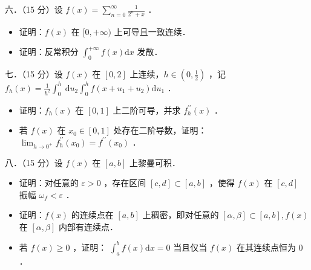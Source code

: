 \documentclass{article}
\begin{document}
六．（15 分）设 \(f(x)=\sum_{n=0}^{\infty} \frac{1}{2^{n}+x}\) ．

\begin{itemize}
  \item[（1）] 证明：\(f(x)\) 在 \([0,+\infty)\) 上可导且一致连续．
  \item[（2）] 证明：反常积分 \(\int_{0}^{+\infty} f(x) \mathrm{d} x\) 发散．
\end{itemize}

七．（15 分）设 \(f(x)\) 在 \([0,2]\) 上连续，\(h \in\left(0, \frac{1}{2}\right)\) ，记 \(f_{h}(x)=\frac{1}{h^{2}} \int_{0}^{h} \mathrm{~d} u_{2} \int_{0}^{h} f\left(x+u_{1}+u_{2}\right) \mathrm{d} u_{1}\) ．

\begin{itemize}
  \item[（1）] 证明：\(f_{h}(x)\) 在 \([0,1]\) 上二阶可导，并求 \(f_{h}^{\prime \prime}(x)\) ．
  \item[（2）] 若 \(f(x)\) 在 \(x_{0} \in[0,1]\) 处存在二阶导数，证明： \(\lim _{h \rightarrow 0^{+}} f_{h}^{\prime \prime}\left(x_{0}\right)=f^{\prime \prime}\left(x_{0}\right)\) ．
\end{itemize}

八．（15 分）设 \(f(x)\) 在 \([a, b]\) 上黎曼可积．

\begin{itemize}
  \item[（1）] 证明：对任意的 \(\varepsilon>0\) ，存在区间 \([c, d] \subset[a, b]\) ，使得 \(f(x)\) 在 \([c, d]\) 振幅 \(\omega_{f}<\varepsilon\) ．
  \item[（2）] 证明：\(f(x)\) 的连续点在 \([a, b]\) 上稠密，即对任意的 \([\alpha, \beta] \subset[a, b], f(x)\) 在 \([\alpha, \beta]\) 内部有连续点．
  \item[（3）] 若 \(f(x) \geq 0\) ，证明： \(\int_{a}^{b} f(x) \mathrm{d} x=0\) 当且仅当 \(f(x)\) 在其连续点恒为 0 ．
\end{itemize}
\end{document}
